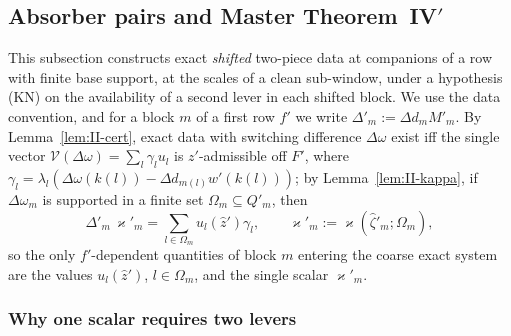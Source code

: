 \documentclass[10pt]{amsart}
\theoremstyle{definition}
\theoremstyle{remark}
\newcommand{\zh}{\hat z}
\begin{document}
\subsection{Absorber pairs and Master Theorem~IV$'$}\label{subsec:II-absorb}

This subsection constructs exact \emph{shifted} two-piece data at
companions of a row with finite base support, at the scales of a clean
sub-window, under a hypothesis (KN) on the availability of a second lever in
each shifted block.  We use the data convention, and for a block $m$ of a
first row $f'$ we write $\Delta'_m:=\Delta d_mM'_m$.  By
Lemma~\ref{lem:II-cert}, exact data with switching difference $\Delta\omega$ exist
iff the single vector $\mathcal V(\Delta\omega)=\sum_l\gamma_lu_l$ is
$z'$-admissible off $F'$, where $\gamma_l=\lambda_l(\Delta\omega(k(l))-\Delta d_{m(l)}
w'(k(l)))$; by Lemma~\ref{lem:II-kappa}, if $\Delta\omega_m$ is supported in a finite
set $\Omega_m\subseteq Q'_m$, then
\begin{equation}\label{eq:II-X3}
 \Delta'_m\,\varkappa'_m=\sum_{l\in\Omega_m}u_l(\zh')\gamma_l,\qquad
 \varkappa'_m:=\varkappa(\hat\zeta'_m;\Omega_m),
\end{equation}
so the only $f'$-dependent quantities of block $m$ entering the coarse exact
system are the values $u_l(\zh')$, $l\in\Omega_m$, and the single scalar
$\varkappa'_m$.

\subsubsection*{Why one scalar requires two levers}
\end{document}
